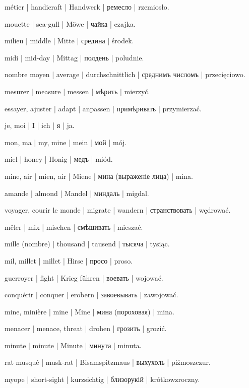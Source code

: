 \begin{outdent}{1em}
métier | handicraft | Handwerk | ремесло | rzemiosło.

mouette | sea-gull | Möwe | чайка | czajka.

milieu | middle | Mitte | средина | środek.

\uvsubentry{}
midi | mid-day | Mittag | полдень | poludnie.


\uvsubentry{}
nombre moyen | average | durchschnittlich | среднимъ числомъ | przecięciowo.

mesurer | measure | messen | мѣрить | mierzyć.

\uvsubentry{}
essayer, ajuster | adapt | anpassen | примѣривать | przymierzać.

je, moi | I | ich | я | ja.

\uvsubentry{}
mon, ma | my, mine | mein | мой | mój.

miel | honey | Honig | медъ | miód.

mine, air | mien, air | Miene | мина (выраженіе лица) | mina.

amande | almond | Mandel | миндаль | migdal.

voyager, courir le monde | migrate | wandern | странствовать | wędrować.

mêler | mix | mischen | смѣшивать | mieszać.

mille (nombre) | thousand | tausend | тысяча | tysiąc.

mil, millet | millet | Hirse | просо | proso.

guerroyer | fight | Krieg führen | воевать | wojować.

\uvsubentry{}
conquérir | conquer | erobern | завоевывать | zawojować.

mine, minière | mine | Mine | мина (пороховая) | mina.

menacer | menace, threat | drohen | грозить | grozić.

minute | minute | Minute | минута | minuta.

rat musqué | musk-rat | Bisamspitzmaus | выхухоль | piźmoszczur.

myope | short-sight | kurzsichtig | близорукій | krótkowzroczny.


\end{outdent}
